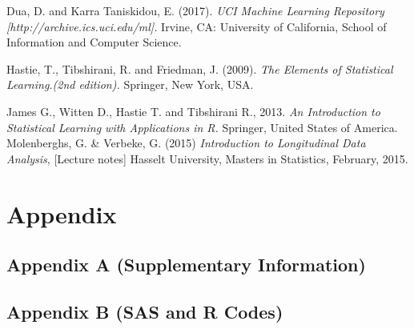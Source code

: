 \documentclass[12pt,a4paper,twoside,openright]{report}
\begin{document}
\begin{thebibliography}{99}
 Dua, D. and Karra Taniskidou, E. (2017). \textit{UCI Machine Learning Repository [http://archive.ics.uci.edu/ml].} Irvine, CA: University of California, School of Information and Computer Science.

Hastie, T., Tibshirani, R. and Friedman, J. (2009).
\textit{The Elements of Statistical Learning.(2nd edition).}
 Springer, New York, USA.
 
 James G., Witten D., Hastie T. and Tibshirani R., 2013. 
 \textit{An Introduction to Statistical Learning with Applications in R.}  Springer, United States of America.
 Molenberghs, G. \& Verbeke, G. (2015) \textit{Introduction to Longitudinal Data Analysis}, [Lecture notes]  Hasselt University, Masters in Statistics, February, 2015.
 
\end{thebibliography}

\chapter{Appendix}
\section{Appendix A (Supplementary Information)}
\section{Appendix B (SAS and R Codes)}
\end{document}
